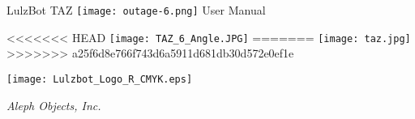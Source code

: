 %
%
%
%
%

\date {}
\thispagestyle{empty}
\begingroup
\centering 

\begin{center}
\fontsize{24pt}{1em}\selectfont LulzBot TAZ
\texttt{[image: outage-6.png]}
\fontsize{24pt}{1em}\selectfont User Manual
\end{center}

\par


<<<<<<< HEAD
\texttt{[image: TAZ\_6\_Angle.JPG]}
=======
\texttt{[image: taz.jpg]}
>>>>>>> a25f6d8e766f743d6a5911d681db30d572e0ef1e

\begin{center}
\texttt{[image: Lulzbot\_Logo\_R\_CMYK.eps]}

{\large \itshape Aleph Objects, Inc.}
\end{center}
\endgroup
